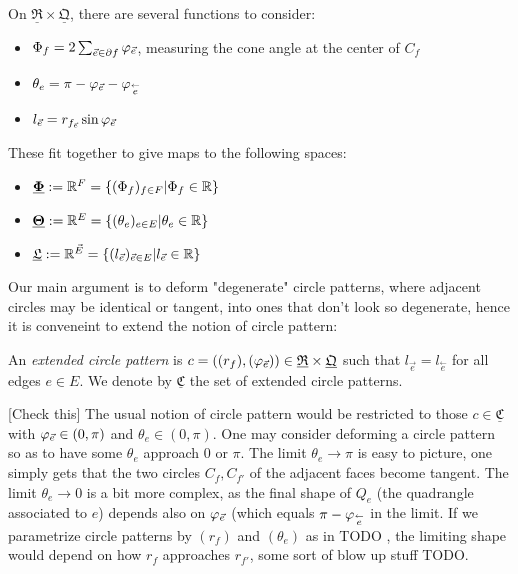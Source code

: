 \documentclass{amsart}
\newcommand{\RRR}{{\underline{\mathfrak{R}}}}
\newcommand{\QQQ}{{\underline{\mathfrak{Q}}}}
\newcommand{\CCC}{{\underline{\mathfrak{C}}}}
\newcommand{\PPP}{{\underline{\mathbf{\Phi}}}}
\newcommand{\TTT}{{\underline{\mathbf{\Theta}}}}
\newcommand{\LLL}{{\underline{\mathfrak{L}}}}
\newcommand{\cev}[1]{\overset{\leftarrow}{#1}}
\begin{document}
On $\RRR \times \QQQ$, there are several functions to consider:
\begin{itemize}
	\item $\Phi_f = 2 \sum_{\vec{e} \in \partial f} \varphi_{\vec{e}}$, measuring the cone angle
		at the center of $C_f$
	\item $\theta_e = \pi - \vphi_{\vec{e}} - \vphi_{\cev{e}}$
	\item $l_{\vec{e}} = r_{f_{\vec{e}}} \sin \varphi_{\vec{e}}$
\end{itemize}

These fit together to give maps to the following spaces:

\begin{itemize}
	\item $\PPP := \RR^F = \{(\Phi_f)_{f\in F} | \Phi_f \in \RR\}$
	\item $\TTT := \RR^E = \{(\theta_e)_{e \in E} | \theta_e \in \RR\}$
	\item $\LLL := \RR^{\vec{E}} = \{(l_{\vec{e}})_{\vec{e} \in E} | l_{\vec{e}} \in \RR\}$
\end{itemize}


Our main argument is to deform "degenerate" circle patterns, where adjacent circles may
be identical or tangent, into ones that don't look so degenerate,
hence it is conveneint to extend the notion of circle pattern:

\begin{definition}
An \emph{extended circle pattern} is $c = ((r_f), (\vphi_{\vec{e}})) \in \RRR \times \QQQ$
such that $l_{\vec{e}} = l_{\cev{e}}$ for all edges $e\in E$. We denote by
$\CCC$ the set of extended circle patterns.
\end{definition}




[Check this] The usual notion of circle pattern would be restricted to those $c\in \CCC$
with $\varphi_{\vec{e}} \in (0,\pi)$ and $\theta_e \in (0,\pi)$.
One may consider deforming a circle pattern so as to have some $\theta_e$ approach 0 or $\pi$.
The limit $\theta_e \to \pi$ is easy to picture, one simply gets that the two circles
$C_f, C_{f'}$ of the adjacent faces become tangent. The limit $\theta_e \to 0$
is a bit more complex, as the final shape of $Q_e$ (the quadrangle associated to $e$)
depends also on $\varphi_{\vec{e}}$ (which equals $\pi - \vphi_{\cev{e}}$ in the limit.
If we parametrize circle patterns by $(r_f)$ and $(\theta_e)$ as in TODO ,
the limiting shape would depend on how $r_f$ approaches $r_{f'}$,
some sort of blow up stuff TODO.
\end{document}
